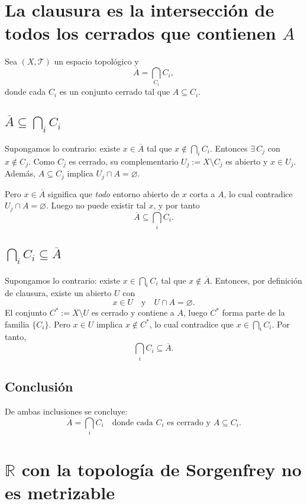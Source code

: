 \documentclass[12pt]{article}
\begin{document}
\section*{La clausura es la intersección de todos los cerrados que contienen $A$}

Sea $(X,\mathcal T)$ un espacio topológico y 
\[
\overline{A} = \bigcap_{C_i} C_i,
\]
donde cada $C_i$ es un conjunto cerrado tal que $A \subseteq C_i$.

\subsection*{$\overline{A}\subseteq \displaystyle\bigcap_{i} C_i$}
Supongamos lo contrario: existe $x \in \overline{A}$ tal que $x \notin \bigcap_i C_i$.
Entonces $\exists\,C_j$ con $x \notin C_j$.
Como $C_j$ es cerrado, su complementario $U_j := X \setminus C_j$ es abierto y $x \in U_j$.
Además, $A \subseteq C_j$ implica $U_j \cap A = \varnothing$.

Pero $x \in \overline{A}$ significa que \emph{todo} entorno abierto de $x$ corta a $A$,
lo cual contradice $U_j \cap A = \varnothing$.
Luego no puede existir tal $x$, y por tanto
\[
\overline{A} \subseteq \bigcap_i C_i.
\]

\subsection*{$\displaystyle\bigcap_{i} C_i \subseteq \overline{A}$}
Supongamos lo contrario: existe $x \in \bigcap_i C_i$ tal que $x \notin \overline{A}$.
Entonces, por definición de clausura, existe un abierto $U$ con
\[
x \in U \quad\text{y}\quad U \cap A = \varnothing.
\]
El conjunto $C^\ast := X \setminus U$ es cerrado y contiene a $A$, luego $C^\ast$ forma parte de la familia $\{C_i\}$.
Pero $x \in U$ implica $x \notin C^\ast$, lo cual contradice que $x \in \bigcap_i C_i$.
Por tanto,
\[
\bigcap_i C_i \subseteq \overline{A}.
\]

\subsection*{Conclusión}
De ambas inclusiones se concluye:
\[
\boxed{\ \overline{A} = \bigcap_i C_i \quad \text{donde cada $C_i$ es cerrado y } A \subseteq C_i.\ }
\]
\section*{$\mathbb{R}$ con la topología de Sorgenfrey no es metrizable}
\end{document}
